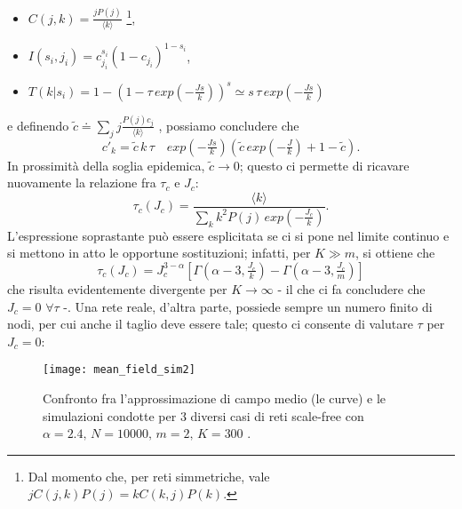 \begin{itemize}
	\item $ C\left(j,k\right) = \frac{j P\left(j\right)}{\langle k \rangle} $ \footnote{Dal momento che, per reti simmetriche, vale $ j C\left(j,k\right) P\left(j\right) = k C\left(k,j\right) P\left(k\right) $.},
	\item $ I\left(s_i, j_i\right) = c_{j_i}^{s_i} \left(1 - c_{j_i}\right)^{1 - s_i} $,
	\item $ T\left(k|s_i\right) = 1 - \left(1 - \tau \, exp(- \tfrac{J s}{k})\right)^s \simeq s \, \tau \, exp(- \tfrac{J s}{k}) $ 
\end{itemize}
e definendo $ \tilde{c} \doteq \sum_j j \tfrac{P\left(j\right) c_j}{\langle k \rangle} $ \cite{Bagnoli2014}, possiamo concludere che 
\begin{equation}
	c'_k = \tilde{c} \, k \, \tau \quad exp(- \tfrac{J s}{k}) \left(\tilde{c} \, exp(- \tfrac{J}{k}) + 1 - \tilde{c}\right).
\end{equation}
In prossimità della soglia epidemica, $ \tilde{c} \to 0 $; questo ci permette di ricavare nuovamente la relazione fra $ \tau_c $ e $ J_c $:
\begin{equation}
	\tau_c\left(J_c\right) = \frac{\langle k \rangle}{\sum_k k^2 P\left(j\right) \, exp(-\tfrac{J_c}{k})}.
\end{equation}
L'espressione soprastante può essere esplicitata se ci si pone nel limite continuo e si mettono in atto le opportune sostituzioni; infatti, per $ K \gg m $, si ottiene che
\begin{equation}
	\tau_c \left(J_c \right) = J_{c}^{3 - \alpha} \left[ \Gamma \left( \alpha - 3, \tfrac{J_c}{k} \right) - \Gamma \left( \alpha - 3, \tfrac{J_c}{m}\right) \right] 	 
\end{equation}
che risulta evidentemente divergente per $ K \to \infty $ - il che ci fa concludere che $ J_c = 0$ $\forall \tau$ -. Una rete reale, d'altra parte, possiede sempre un numero finito di nodi, per cui anche il taglio deve essere tale; questo ci consente di valutare $ \tau $ per $ J_c = 0 $:
\begin{figure}[t]
		\begin{center}
			\texttt{[image: mean\_field\_sim2]}
			\caption{Confronto fra l'approssimazione di campo medio (le curve) e le simulazioni condotte per $ 3 $ diversi casi di reti scale-free con $ \alpha = 2.4, \, N = 10000, \, m = 2, \, K = 300 $ \cite{Bagnoli2014} .}
			\label{fig:sim2}
		\end{center}
\end{figure}

